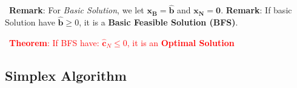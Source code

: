 \documentclass[9pt]{article}
\begin{document}
\star \ {\small \textbf{Remark}: For \textit{Basic Solution}, we let $\mathbf{x_B}=\widehat{\mathbf{b}}$ and $\mathbf{x_N}=\mathbf{0}$. \qquad \textbf{Remark}: If basic Solution have $\widehat{\mathbf{b}}\geq0$, it is a \textbf{Basic Feasible Solution (BFS)}.}

\star \ {\small \textcolor{red}{\textbf{Theorem}: If BFS have: $\widehat{\mathbf{c}}_N\leq0$, it is an \textbf{Optimal Solution}}}

\newpage


\subsection{Simplex Algorithm}

\end{document}
